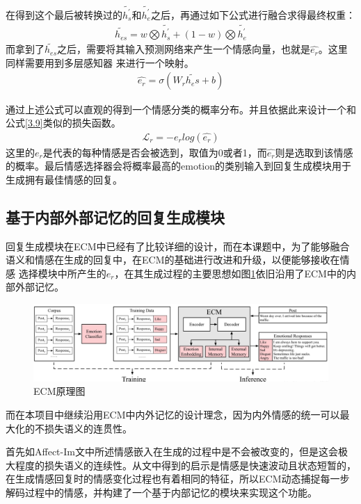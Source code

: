 \documentclass[supercite]{HustGraduPaper}
\theoremstyle{definition}
\begin{document}
在得到这个最后被转换过的$\widetilde{h_s^{'}}$和$\widetilde{h_e^{'}}$之后，再通过如下公式进行融合求得最终权重：
\begin{align}
  {\widetilde{h_{es}}} = w \bigotimes {\widetilde{h_s^{'}}} + (1 - w) \bigotimes {\widetilde{h_e^{'}}} \label{3.13}
\end{align}
而拿到了$\widetilde{h_{es}}$之后，需要将其输入预测网络来产生一个情感向量，也就是$\hat{e_r}$。这里同样需要用到多层感知器
来进行一个映射。
\begin{align}
  \hat{e_r} = \sigma(W_r \widetilde{h_es} + b) \label{3.14}
\end{align}

通过上述公式可以直观的得到一个情感分类的概率分布。并且依据此来设计一个和公式\ref{3.9}类似的损失函数。
\begin{align}
  \mathcal{L}_r = -e_r log(\hat{e_r}) \label{3.15} 
\end{align}
这里的$e_r$是代表的每种情感是否会被选到，取值为0或者1，而$\hat{e_r}$则是选取到该情感的概率。最后情感选择器会将概率最高的emotion的类别输入到回复生成模块用于生成拥有最佳情感的回复。

\subsection{基于内部外部记忆的回复生成模块}
回复生成模块在ECM\cite{DBLP:journals/corr/ZhouHZZL17}中已经有了比较详细的设计，而在本课题中，为了能够融合语义和情感在生成的回复中，在ECM的基础进行改进和升级，以便能够接收在情感
选择模块中所产生的$e_r$，在其生成过程的主要思想如图\ref{Fig.ECM}依旧沿用了ECM中的内部外部记忆。
\begin{figure}[htbp] %
  \centering %
  \includegraphics[width=1\textwidth]{images/ECM.png} %
  \caption{ECM原理图} %
  \label{Fig.ECM} %
\end{figure}
而在本项目中继续沿用ECM中内外记忆的设计理念，因为内外情感的统一可以最大化的不损失语义的连贯性。

首先如Affect-Im\cite{ghosh2017affect}文中所述情感嵌入在生成的过程中是不会被改变的，但是这会极大程度的损失语义的连续性。从文中得到的启示是情感是快速波动且状态短暂的，
在生成情感回复时的情感变化过程也有着相同的特征，所以ECM动态捕捉每一步解码过程中的情感，并构建了一个基于内部记忆的模块来实现这个功能。
\end{document}
